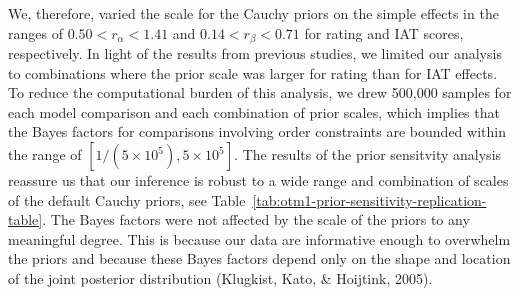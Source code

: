 \documentclass[
  doc]{apa6}
\begin{document}
We, therefore, varied the scale for the Cauchy priors on the simple effects in the ranges of \(0.50 < r_\alpha < 1.41\) and \(0.14 < r_\beta < 0.71\) for rating and IAT scores, respectively.
In light of the results from previous studies, we limited our analysis to combinations where the prior scale was larger for rating than for IAT effects.
To reduce the computational burden of this analysis, we drew 500,000 samples for each model comparison and each combination of prior scales, which implies that the Bayes factors for comparisons involving order constraints are bounded within the range of \([1 / (5 \times 10^5), 5 \times 10^5]\).
The results of the prior sensitvity analysis reassure us that our inference is robust to a wide range and combination of scales of the default Cauchy priors, see Table~\ref{tab:otm1-prior-sensitivity-replication-table}.
The Bayes factors were not affected by the scale of the priors to any meaningful degree.
This is because our data are informative enough to overwhelm the priors and because these Bayes factors depend only on the shape and location of the joint posterior distribution (Klugkist, Kato, \& Hoijtink, 2005).
\end{document}
